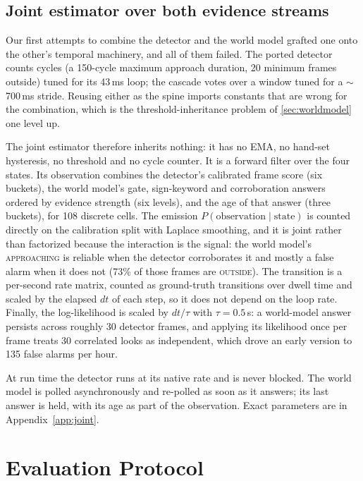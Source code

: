 \documentclass[journal]{IEEEtran}
\begin{document}
\subsection{Joint estimator over both evidence streams}
\label{sec:jointdesign}

Our first attempts to combine the detector and the world model grafted one onto the other's temporal machinery, and all of them failed.  The ported detector counts cycles (a 150-cycle maximum approach duration, 20 minimum frames outside) tuned for its 43\,ms loop; the cascade votes over a window tuned for a $\sim$700\,ms stride.  Reusing either as the spine imports constants that are wrong for the combination, which is the threshold-inheritance problem of \cref{sec:worldmodel} one level up.

The joint estimator therefore inherits nothing: it has no EMA, no hand-set hysteresis, no threshold and no cycle counter.  It is a forward filter over the four states.  Its observation combines the detector's calibrated frame score (six buckets), the world model's gate, sign-keyword and corroboration answers ordered by evidence strength (six levels), and the age of that answer (three buckets), for 108 discrete cells.  The emission $P(\text{observation}\mid\text{state})$ is counted directly on the calibration split with Laplace smoothing, and it is joint rather than factorized because the interaction is the signal: the world model's \textsc{approaching} is reliable when the detector corroborates it and mostly a false alarm when it does not (73\% of those frames are \textsc{outside}).  The transition is a per-second rate matrix, counted as ground-truth transitions over dwell time and scaled by the elapsed $dt$ of each step, so it does not depend on the loop rate.  Finally, the log-likelihood is scaled by $dt/\tau$ with $\tau=0.5$\,s: a world-model answer persists across roughly 30 detector frames, and applying its likelihood once per frame treats 30 correlated looks as independent, which drove an early version to 135 false alarms per hour.

At run time the detector runs at its native rate and is never blocked.  The world model is polled asynchronously and re-polled as soon as it answers; its last answer is held, with its age as part of the observation.  Exact parameters are in Appendix~\ref{app:joint}.



\section{Evaluation Protocol}
\label{sec:protocol}
\end{document}
